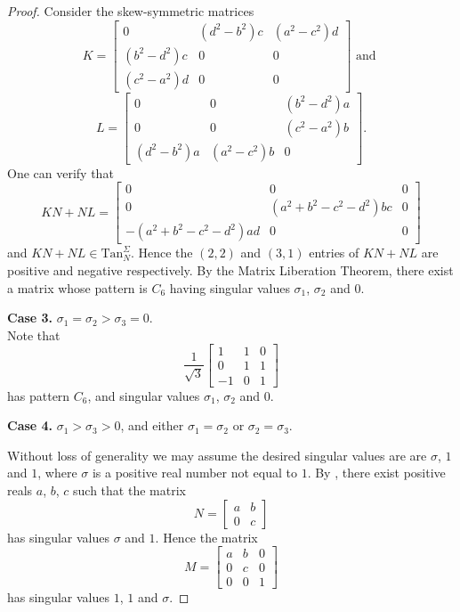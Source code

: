 \documentclass[preprint,12pt]{elsarticle}
\begin{document}
\begin{proof}
Consider the skew-symmetric matrices
\[
K=\left[ 
\begin{array}{ccc}
0 & (d^2-b^2)c & (a^2-c^2)d \\
(b^2-d^2)c & 0 & 0 \\
(c^2-a^2)d & 0 &0 
\end{array} \right] \mbox{ and } 
\]
\[   
L= 
\left[
\begin{array}{ccc}
            0    &          0  & (b^2 - d^2)a\\
             0   &0 & (c^2 - a^2)b\\
(d^2 - b^2)a & (a^2 - c^2)b &              0
\end{array} \right]. 
\]
One can verify that 
\[ 
KN+NL = 
\left[
\begin{array}{ccc}
0 & 0 & 0\\
0 &  (a^2 + b^2 - c^2 - d^2)bc &  0 \\
-(a^2 + b^2 - c^2 - d^2)ad &  0 & 0
\end{array} 
\right]
\] 
and $KN+NL\in \mbox{Tan}_N^{\Sigma}$.
Hence the $(2,2)$ and $(3,1)$ entries of $KN+NL$ are positive and negative respectively.
By the Matrix Liberation Theorem, there exist a matrix whose  pattern is
$C_6$
having singular values $\sigma_1$, $\sigma_2$ and $0$. 

\bigskip\noindent
{\bf Case 3.} $ \sigma_1=\sigma_2> \sigma_3=0$. 
\\ 
Note that  
\[ 
\frac{1}{\sqrt{3}}\left[ 
\begin{array}{rrr}
1 & 1 & 0 \\
0 & 1 & 1 \\
-1 & 0 & 1
\end{array} 
\right]
\]
has pattern $C_6$, and singular values $\sigma_1$, $\sigma_2$ and $0$.

\bigskip\noindent
{\bf Case 4.} $\sigma_1>\sigma_3>0$, and either 
$\sigma_1=\sigma_2$ or $\sigma_2=\sigma_3$.

Without loss of generality we may assume the desired 
singular values are 
 are $\sigma$, $1$ and $1$,
where $\sigma$ is a positive real number not equal to $1$. 
By , there exist positive reals $a$, $b$, $c$ such that 
the matrix 
\[ 
N=\left[ 
\begin{array}{cc}
a& b 
\\
0 & c
\end{array}
\right] 
\] 
has singular values $\sigma$ and $1$. Hence the matrix 
\[ 
M=\left[
\begin{array}{ccc}
a & b & 0 
\\
0 & c & 0 \\
0 & 0 & 1 
\end{array}
\right] 
\]
has singular values $1$, $1$ and $\sigma$.


\end{proof}
\end{document}
